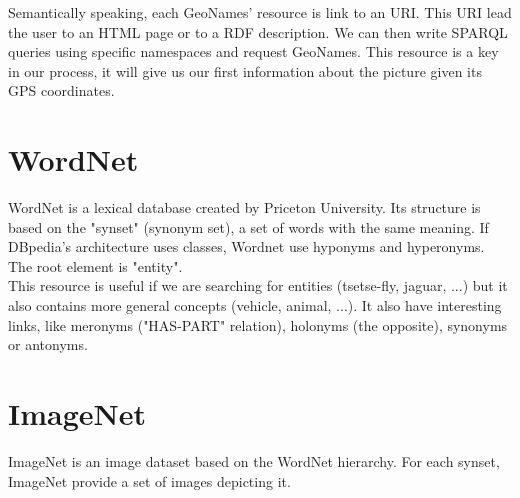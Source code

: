 Semantically speaking, each GeoNames' resource is link to an URI. This URI lead the user to an HTML page or to a RDF description. We can then write SPARQL queries using specific namespaces and request GeoNames. This resource is a key in our process, it will give us our first information about the picture given its GPS coordinates.

\section{WordNet}

WordNet is a lexical database created by Priceton University. Its structure is based on the "synset" (synonym set), a set of words with the same meaning. If DBpedia's architecture uses classes, Wordnet use hyponyms and hyperonyms. The root element is "entity".\\

This resource is useful if we are searching for entities (tsetse-fly, jaguar, ...) but it also contains more general concepts (vehicle, animal, ...). It also have interesting links, like meronyms ("HAS-PART" relation), holonyms (the opposite), synonyms or antonyms.

\section{ImageNet}

ImageNet is an image dataset based on the WordNet hierarchy. For each synset, ImageNet provide a set of images depicting it.